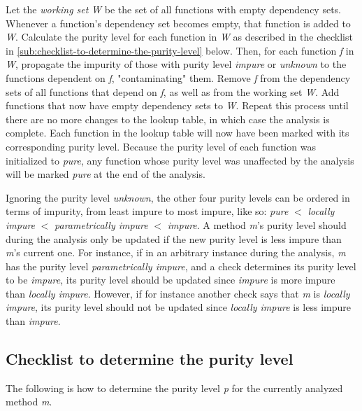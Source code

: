 \documentclass[a4paper,12pt]{article}
\begin{document}
Let the \textit{working set} \textit{W} be the set of all functions with empty dependency sets. Whenever a function's dependency set becomes empty, that function is added to \textit{W}. Calculate the purity level for each function in \textit{W} as described in the checklist in \autoref{sub:checklist-to-determine-the-purity-level} below. Then, for each function \textit{f} in \textit{W}, propagate the impurity of those with purity level \textit{impure} or \textit{unknown} to the functions dependent on \textit{f}, "contaminating" them. Remove \textit{f} from the dependency sets of all functions that depend on \textit{f}, as well as from the working set \textit{W}. Add functions that now have empty dependency sets to \textit{W}. Repeat this process until there are no more changes to the lookup table, in which case the analysis is complete. Each function in the lookup table will now have been marked with its corresponding purity level. Because the purity level of each function was initialized to \textit{pure}, any function whose purity level was unaffected by the analysis will be marked \textit{pure} at the end of the analysis.

Ignoring the purity level \textit{unknown}, the other four purity levels can be ordered in terms of impurity, from least impure to most impure, like so: \textit{pure} $<$ \textit{locally impure} $<$ \textit{parametrically impure} $<$ \textit{impure}. A method \textit{m}'s purity level should during the analysis only be updated if the new purity level is less impure than \textit{m}'s current one. For instance, if in an arbitrary instance during the analysis, \textit{m} has the purity level \textit{parametrically impure}, and a check determines its purity level to be \textit{impure}, its purity level should be updated since \textit{impure} is more impure than \textit{locally impure}. However, if for instance another check says that \textit{m} is \textit{locally impure}, its purity level should not be updated since \textit{locally impure} is less impure than \textit{impure}.

\subsection{Checklist to determine the purity level} \label{sub:checklist-to-determine-the-purity-level}

The following is how to determine the purity level \textit{p} for the currently analyzed method \textit{m}.
\end{document}
